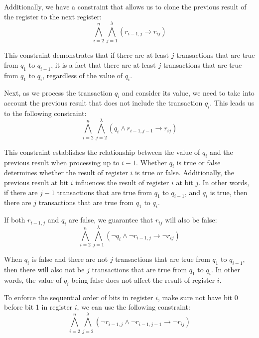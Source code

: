 Additionally, we have a constraint that allows us to clone the previous result of the register to the next register:
\begin{equation}
    \label{eq:relationship_between_q_i_and_previous_result}
    \bigwedge_{i=2}^{n} \bigwedge_{j=1}^{\lambda} \left( r_{i-1,j} \rightarrow r_{ij} \right)
\end{equation}

This constraint demonstrates that if there are at least $j$ transactions that are true from $q_1$ to $q_{i-1}$,
it is a fact that there are at least $j$ transactions that are true from $q_1$ to $q_i$, regardless of the value of $q_i$.

Next, as we process the transaction $q_i$ and consider its value, we need to take into account the previous result that does not include the transaction $q_i$.
This leads us to the following constraint:
\begin{equation}
    \label{eq:previous_result_without_q_i_true_and_q_i_true_then_register_true}
    \bigwedge_{i=2}^{n} \bigwedge_{j=2}^{\lambda} \left( q_{i} \wedge r_{i-1,j-1} \rightarrow r_{ij} \right)
\end{equation}

This constraint establishes the relationship between the value of $q_i$ and the previous result
when processing up to $i-1$.
Whether $q_i$ is true or false determines whether the result of register $i$
is true or false.
Additionally, the previous result at bit $i$ influences the result of register $i$ at bit $j$.
In other words, if there are $j-1$ transactions that are true from $q_1$ to $q_{i-1}$,
and $q_i$ is true, then there are $j$ transactions that are true from $q_1$ to $q_i$.

If both $r_{i-1,j}$ and $q_i$ are false, we guarantee that $r_{ij}$ will also be false:
\begin{equation}
    \label{eq:no_change_when_q_i_false}
    \bigwedge_{i=2}^{n} \bigwedge_{j=1}^{\lambda} \left( \neg q_{i} \wedge \neg r_{i-1,j} \rightarrow \neg r_{ij} \right)
\end{equation}

When $q_i$ is false and there are not $j$ transactions that are true from $q_1$ to $q_{i-1}$,
then there will also not be $j$ transactions that are true from $q_1$ to $q_i$.
In other words, the value of $q_i$ being false does not affect the result of register $i$.

To enforce the sequential order of bits in register $i$, make sure not have bit 0 before bit 1 in register $i$, we can use the following constraint:
\begin{equation}
    \label{eq:sequential_order}
    \bigwedge_{i=2}^{n} \bigwedge_{j=2}^{\lambda} \left( \neg r_{i-1,j} \wedge \neg r_{i-1,j-1} \rightarrow \neg r_{ij} \right)
\end{equation}

